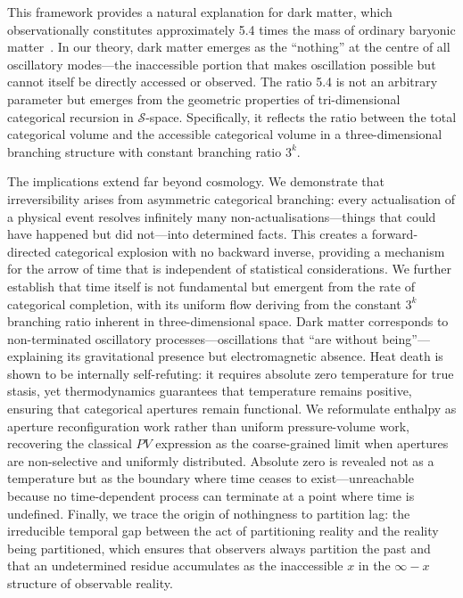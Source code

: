 \documentclass[12pt,a4paper]{article}
\theoremstyle{definition}
\theoremstyle{remark}
\newcommand{\Sentropy}{\mathcal{S}}
\begin{document}
This framework provides a natural explanation for dark matter, which observationally constitutes approximately 5.4 times the mass of ordinary baryonic matter~\citep{planck2020}. In our theory, dark matter emerges as the ``nothing'' at the centre of all oscillatory modes—the inaccessible portion that makes oscillation possible but cannot itself be directly accessed or observed. The ratio 5.4 is not an arbitrary parameter but emerges from the geometric properties of tri-dimensional categorical recursion in $\Sentropy$-space. Specifically, it reflects the ratio between the total categorical volume and the accessible categorical volume in a three-dimensional branching structure with constant branching ratio $3^k$.

The implications extend far beyond cosmology. We demonstrate that irreversibility arises from asymmetric categorical branching: every actualisation of a physical event resolves infinitely many non-actualisations—things that could have happened but did not—into determined facts. This creates a forward-directed categorical explosion with no backward inverse, providing a mechanism for the arrow of time that is independent of statistical considerations. We further establish that time itself is not fundamental but emergent from the rate of categorical completion, with its uniform flow deriving from the constant $3^k$ branching ratio inherent in three-dimensional space. Dark matter corresponds to non-terminated oscillatory processes—oscillations that ``are without being''—explaining its gravitational presence but electromagnetic absence. Heat death is shown to be internally self-refuting: it requires absolute zero temperature for true stasis, yet thermodynamics guarantees that temperature remains positive, ensuring that categorical apertures remain functional. We reformulate enthalpy as aperture reconfiguration work rather than uniform pressure-volume work, recovering the classical $PV$ expression as the coarse-grained limit when apertures are non-selective and uniformly distributed. Absolute zero is revealed not as a temperature but as the boundary where time ceases to exist—unreachable because no time-dependent process can terminate at a point where time is undefined. Finally, we trace the origin of nothingness to partition lag: the irreducible temporal gap between the act of partitioning reality and the reality being partitioned, which ensures that observers always partition the past and that an undetermined residue accumulates as the inaccessible $x$ in the $\infty - x$ structure of observable reality.
\end{document}

